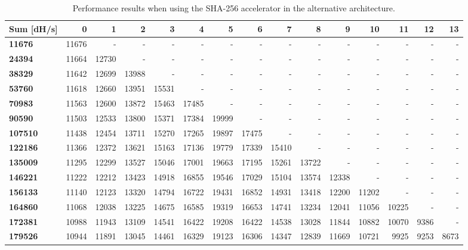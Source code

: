 \begin{appendix}
\begin{sidewaystable}
\centering
\begin{tabular}{| l || r r r r r r r r r r r r r r |}
  \hline 
  \textbf{Sum} [dH/s] & \textbf{0} & \textbf{1} & \textbf{2} & \textbf{3} & \textbf{4} & \textbf{5} & \textbf{6} & \textbf{7} & \textbf{8} & \textbf{9} & \textbf{10} & \textbf{11} & \textbf{12} & \textbf{13}\\
  \hline                       
  \textbf{11676} & 11676 & - & - & - & - & - & - & - & - & - & - & - & - & -\\
  \textbf{24394} & 11664 & 12730 & - & - & - & - & - & - & - & - & - & - & - & -\\
  \textbf{38329} & 11642 & 12699 & 13988 & - & - & - & - & - & - & - & - & - & - & -\\
  \textbf{53760} & 11618 & 12660 & 13951 & 15531 & - & - & - & - & - & - & - & - & - & -\\
  \textbf{70983} & 11563 & 12600 & 13872 & 15463 & 17485 & - & - & - & - & - & - & - & - & -\\
  \textbf{90590} & 11503 & 12533 & 13800 & 15371 & 17384 & 19999 & - & - & - & - & - & - & - & -\\
  \textbf{107510} & 11438 & 12454 & 13711 & 15270 & 17265 & 19897 & 17475 & - & - & - & - & - & - & -\\
  \textbf{122186} & 11366 & 12372 & 13621 & 15163 & 17136 & 19779 & 17339 & 15410 & - & - & - & - & - & -\\
  \textbf{135009} & 11295 & 12299 & 13527 & 15046 & 17001 & 19663 & 17195 & 15261 & 13722 & - & - & - & - & -\\
  \textbf{146221} & 11222 & 12212 & 13423 & 14918 & 16855 & 19546 & 17029 & 15104 & 13574 & 12338 & - & - & - & -\\
  \textbf{156133} & 11140 & 12123 & 13320 & 14794 & 16722 & 19431 & 16852 & 14931 & 13418 & 12200 & 11202 & - & - & -\\
  \textbf{164860} & 11068 & 12038 & 13225 & 14675 & 16585 & 19319 & 16653 & 14741 & 13234 & 12041 & 11056 & 10225 & - & -\\
  \textbf{172381} & 10988 & 11943 & 13109 & 14541 & 16422 & 19208 & 16422 & 14538 & 13028 & 11844 & 10882 & 10070 & 9386 & -\\
  \textbf{179526} & 10944 & 11891 & 13045 & 14461 & 16329 & 19123 & 16306 & 14347 & 12839 & 11669 & 10721 & 9925 & 9253 & 8673 \\
  \hline  
\end{tabular}
\caption{Performance results when using the SHA-256 accelerator in the alternative architecture.}
\label{tab:Perf-SHA2}
\end{sidewaystable}


\end{appendix}
